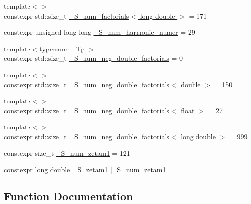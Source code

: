 \begin{DoxyCompactItemize}
\item 
{\footnotesize template$<$$>$ }\\constexpr std\+::size\+\_\+t \hyperlink{namespacestd_1_1____detail_ab90b8eb39ff963a5ed533a3be0b7f7fd}{\+\_\+\+S\+\_\+num\+\_\+factorials$<$ long double $>$} = 171
\item 
constexpr unsigned long long \hyperlink{namespacestd_1_1____detail_a554788747841f6abbfd7572673df32ad}{\+\_\+\+S\+\_\+num\+\_\+harmonic\+\_\+numer} = 29
\item 
{\footnotesize template$<$typename \+\_\+\+Tp $>$ }\\constexpr std\+::size\+\_\+t \hyperlink{namespacestd_1_1____detail_ac386f200e589ce1fc895c2aac0e47f8c}{\+\_\+\+S\+\_\+num\+\_\+neg\+\_\+double\+\_\+factorials} = 0
\item 
{\footnotesize template$<$$>$ }\\constexpr std\+::size\+\_\+t \hyperlink{namespacestd_1_1____detail_a2d14a1207a6fea22f32586dfd41cf49d}{\+\_\+\+S\+\_\+num\+\_\+neg\+\_\+double\+\_\+factorials$<$ double $>$} = 150
\item 
{\footnotesize template$<$$>$ }\\constexpr std\+::size\+\_\+t \hyperlink{namespacestd_1_1____detail_a3ce62e66e9a196fd89b4d841f7374d68}{\+\_\+\+S\+\_\+num\+\_\+neg\+\_\+double\+\_\+factorials$<$ float $>$} = 27
\item 
{\footnotesize template$<$$>$ }\\constexpr std\+::size\+\_\+t \hyperlink{namespacestd_1_1____detail_a2ef051ec96e521e71489d2327d11c22a}{\+\_\+\+S\+\_\+num\+\_\+neg\+\_\+double\+\_\+factorials$<$ long double $>$} = 999
\item 
constexpr size\+\_\+t \hyperlink{namespacestd_1_1____detail_a807e36c2aec3a9f27fdb21726cd464e2}{\+\_\+\+S\+\_\+num\+\_\+zetam1} = 121
\item 
constexpr long double \hyperlink{namespacestd_1_1____detail_a22ed80d9e5c3bc79e61a3cdb8e79a462}{\+\_\+\+S\+\_\+zetam1} \mbox{[}\hyperlink{namespacestd_1_1____detail_a807e36c2aec3a9f27fdb21726cd464e2}{\+\_\+\+S\+\_\+num\+\_\+zetam1}\mbox{]}
\end{DoxyCompactItemize}


\subsection{Function Documentation}
